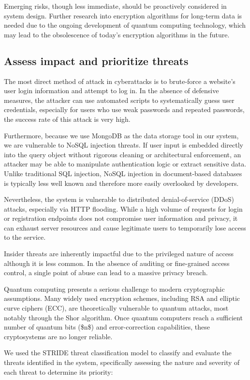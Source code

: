 \documentclass{article}
\begin{document}
Emerging risks, though less immediate, should be proactively considered in system design. Further research into encryption algorithms for long-term data is needed due to the ongoing development of quantum computing technology, which may lead to the obsolescence of today's encryption algorithms in the future.

\subsection{Assess impact and prioritize threats}
The most direct method of attack in cyberattacks is to brute-force a website's user login information and attempt to log in. In the absence of defensive measures, the attacker can use automated scripts to systematically guess user credentials, especially for users who use weak passwords and repeated passwords, the success rate of this attack is very high. 

Furthermore, because we use MongoDB as the data storage tool in our system, we are vulnerable to NoSQL injection threats. If user input is embedded directly into the query object without rigorous cleaning or architectural enforcement, an attacker may be able to manipulate authentication logic or extract sensitive data. Unlike traditional SQL injection, NoSQL injection in document-based databases is typically less well known and therefore more easily overlooked by developers. 

Nevertheless, the system is vulnerable to distributed denial-of-service (DDoS) attacks, especially via HTTP flooding. While a high volume of requests for login or registration endpoints does not compromise user information and privacy, it can exhaust server resources and cause legitimate users to temporarily lose access to the service. 

Insider threats are inherently impactful due to the privileged nature of access although it is less common. In the absence of auditing or fine-grained access control, a single point of abuse can lead to a massive privacy breach.

Quantum computing presents a serious challenge to modern cryptographic assumptions. Many widely used encryption schemes, including RSA and elliptic curve ciphers (ECC), are theoretically vulnerable to quantum attacks, most notably through the Shor algorithm. Once quantum computers reach a sufficient number of quantum bits (\$n\$) and error-correction capabilities, these cryptosystems are no longer reliable.

We used the STRIDE threat classification model to classify and evaluate the threats identified in the system, specifically assessing the nature and severity of each threat to determine its priority:
\end{document}
